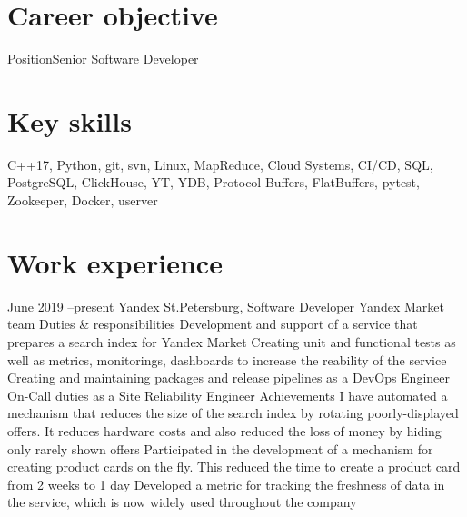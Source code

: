 \documentclass[11pt,a4paper]{moderncv}
\def\mark{{\small$\bullet$} }
\begin{document}
\maketitle

\section{Career objective}
\cvline
    {Position}{Senior Software Developer}

\section{Key skills}
\cvline
    {}
    {C++17, Python, git, svn, Linux, MapReduce, Cloud Systems, CI/CD, SQL, PostgreSQL, ClickHouse, YT, YDB, Protocol Buffers, FlatBuffers, pytest, Zookeeper, Docker, userver}

\section{Work experience}
\cventry
    {June 2019 --\newline present} %
    {\href{https://market.yandex.ru/}{Yandex}}
    {St.Petersburg, Software Developer}
    {Yandex Market team}
    {}
    {
        {\large Duties \& responsibilities}
        \newline \mark Development and support of a service that prepares a search index for Yandex Market
        \newline \mark Creating unit and functional tests as well as metrics, monitorings, dashboards to increase the reability of the service
        \newline \mark Creating and maintaining packages and release pipelines as a DevOps Engineer
        \newline \mark On-Call duties as a Site Reliability Engineer
        \newline
        {\large Achievements}
        \newline \mark I have automated a mechanism that reduces the size of the search index by rotating poorly-displayed offers. It reduces hardware costs and also reduced the loss of money by hiding only rarely shown offers
        \newline \mark Participated in the development of a mechanism for creating product cards on the fly. This reduced the time to create a product card from 2 weeks to 1 day
        \newline \mark Developed a metric for tracking the freshness of data in the service, which is now widely used throughout the company
    }
\end{document}
